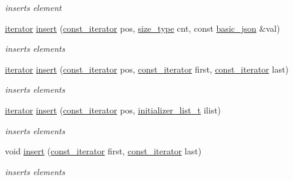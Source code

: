 \begin{DoxyCompactItemize}
\begin{DoxyCompactList}\small\item\em inserts element \end{DoxyCompactList}\item 
\hyperlink{classnlohmann_1_1basic__json_aa549b2b382916b3baafb526e5cb410bd}{iterator} \hyperlink{classnlohmann_1_1basic__json_a71e197e6cc78c3960011f68a75f8ef22}{insert} (\hyperlink{classnlohmann_1_1basic__json_aebd2cfa7e4ded4e97cde9269bfeeea38}{const\+\_\+iterator} pos, \hyperlink{classnlohmann_1_1basic__json_a3ada29bca70b4965f6fd37ec1c8f85f7}{size\+\_\+type} cnt, const \hyperlink{classnlohmann_1_1basic__json}{basic\+\_\+json} \&val)
\begin{DoxyCompactList}\small\item\em inserts elements \end{DoxyCompactList}\item 
\hyperlink{classnlohmann_1_1basic__json_aa549b2b382916b3baafb526e5cb410bd}{iterator} \hyperlink{classnlohmann_1_1basic__json_a8137d5471edcd71606e42155ed9c23e2}{insert} (\hyperlink{classnlohmann_1_1basic__json_aebd2cfa7e4ded4e97cde9269bfeeea38}{const\+\_\+iterator} pos, \hyperlink{classnlohmann_1_1basic__json_aebd2cfa7e4ded4e97cde9269bfeeea38}{const\+\_\+iterator} first, \hyperlink{classnlohmann_1_1basic__json_aebd2cfa7e4ded4e97cde9269bfeeea38}{const\+\_\+iterator} last)
\begin{DoxyCompactList}\small\item\em inserts elements \end{DoxyCompactList}\item 
\hyperlink{classnlohmann_1_1basic__json_aa549b2b382916b3baafb526e5cb410bd}{iterator} \hyperlink{classnlohmann_1_1basic__json_a856b8764efd21dac4205a00fec82e09a}{insert} (\hyperlink{classnlohmann_1_1basic__json_aebd2cfa7e4ded4e97cde9269bfeeea38}{const\+\_\+iterator} pos, \hyperlink{classnlohmann_1_1basic__json_a4d392f594e4c32345d47c2a175aad5c8}{initializer\+\_\+list\+\_\+t} ilist)
\begin{DoxyCompactList}\small\item\em inserts elements \end{DoxyCompactList}\item 
void \hyperlink{classnlohmann_1_1basic__json_a0181d03c6314bedcbad2e92d3676223c}{insert} (\hyperlink{classnlohmann_1_1basic__json_aebd2cfa7e4ded4e97cde9269bfeeea38}{const\+\_\+iterator} first, \hyperlink{classnlohmann_1_1basic__json_aebd2cfa7e4ded4e97cde9269bfeeea38}{const\+\_\+iterator} last)
\begin{DoxyCompactList}\small\item\em inserts elements \end{DoxyCompactList}\item 

\end{DoxyCompactItemize}
